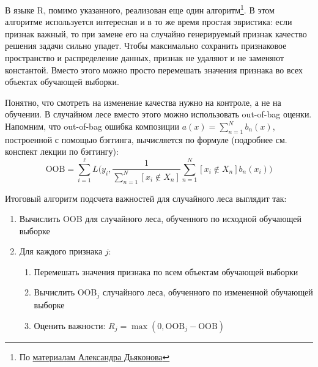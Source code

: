 \documentclass[12pt,a4paper]{article}
\begin{document}
     \par В языке R, помимо указанного, реализован еще один алгоритм\footnote{По \href{http://www.machinelearning.ru/wiki/images/c/cc/PZAD2016_09_rf.pdf}{материалам Александра Дьяконова}}. В этом алгоритме используется интересная и в то же время простая эвристика: если признак важный, то при замене его на случайно генерируемый признак качество решения задачи сильно упадет. Чтобы максимально сохранить признаковое пространство и распределение данных, признак не удаляют и не заменяют константой. Вместо этого можно просто перемешать значения признака во всех объектах обучающей выборки.
     
     Понятно, что смотреть на изменение качества нужно на контроле, а не на обучении. В случайном лесе вместо этого можно использовать  out-of-bag оценки. Напомним, что out-of-bag ошибка композиции $a(x) = \sum_{n=1}^N b_n(x)$, построенной с помощью бэггинга, вычисляется по формуле (подробнее см. конспект лекции по бэггингу):
     \[
     \text{OOB} = \sum_{i=1}^\ell L\biggl(y_i, \frac 1 {\sum_{n=1}^N [x_i \notin X_n]} \sum_{n=1}^N [x_i \notin X_n] b_n(x_i)\biggr)
     \]
     
     Итоговый алгоритм подсчета важностей для случайного леса выглядит так:
     \begin{enumerate}
     	\item Вычислить OOB для случайного леса, обученного по исходной обучающей выборке
     	\item Для каждого признака $j$:
     	\begin{enumerate}
     		\item Перемешать значения признака по всем объектам обучающей выборки
     		\item Вычислить OOB$_j$ случайного леса, обученного по измененной обучающей выборке
     		\item Оценить важности: $R_j = \max(0, \text{OOB}_j-\text{OOB})$
     	\end{enumerate}
     \end{enumerate}
 
    
\end{document}
